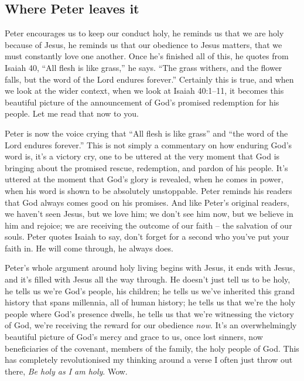 \subsection{Where Peter leaves it}

Peter encourages us to keep our conduct holy, he reminds us that we are holy
because of Jesus, he reminds us that our obedience to Jesus matters, that we
must constantly love one another. Once he's finished all of this, he quotes from
Isaiah 40, \enquote{All flesh is like grass,} he says. \enquote{The grass
withers, and the flower falls, but the word of the Lord endures forever.}
Certainly this is true, and when we look at the wider context, when we look at
Isaiah 40:1–11, it becomes this beautiful picture of the announcement of God's
promised redemption for his people. Let me read that now to you.

Peter is now the voice crying that \enquote{All flesh is like grass} and
\enquote{the word of the Lord endures forever.} This is not simply a commentary
on how enduring God's word is, it's a victory cry, one to be uttered at the very
moment that God is bringing about the promised rescue, redemption, and pardon of
his people. It's uttered at the moment that God's glory is revealed, when he
comes in power, when his word is shown to be absolutely unstoppable. Peter
reminds his readers that God always comes good on his promises. And like Peter's
original readers, we haven't seen Jesus, but we love him; we don't see him now,
but we believe in him and rejoice; we are receiving the outcome of our faith –
the salvation of our souls. Peter quotes Isaiah to say, don't forget for a
second who you've put your faith in. He will come through, he always does.

Peter's whole argument around holy living begins with Jesus, it ends with Jesus,
and it's filled with Jesus all the way through. He doesn't just tell us to be
holy, he tells us we're God's people, his children; he tells us we've inherited
this grand history that spans millennia, all of human history; he tells us that
we're the holy people where God's presence dwells, he tells us that we're
witnessing the victory of God, we're receiving the reward for our obedience
\textit{now}. It's an overwhelmingly beautiful picture of God's mercy and grace
to us, once lost sinners, now beneficiaries of the covenant, members of the
family, the holy people of God. This has completely revolutionised my thinking
around a verse I often just throw out there, \textit{Be holy as I am holy}. Wow.


